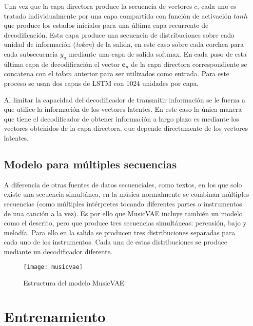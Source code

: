Una vez que la capa directora produce la secuencia de vectores $c$, cada uno es tratado individualmente por una capa compartida con función de activación $tanh$ que produce los estados iniciales para una última capa recurrente de decodificación. Esta capa produce una secuencia de distribuciones sobre cada unidad de información (\textit{token}) de la salida, en este caso sobre cada corchea para cada subsecuencia $y_u$ mediante una capa de salida softmax. En cada paso de esta última capa de decodificación el vector $\textbf{c}_u$ de la capa directora correspondiente se concatena con el $\textit{token}$ anterior para ser utilizados como entrada. Para este proceso se usan dos capas de LSTM con 1024 unidades por capa.

Al limitar la capacidad del decodificador de transmitir información se le fuerza a que utilice la información de los vectores latentes. En este caso la única manera que tiene el decodificador de obtener información a largo plazo es mediante los vectores obtenidos de la capa directora, que depende directamente de los vectores latentes.

\subsection{Modelo para múltiples secuencias}

A diferencia de otras fuentes de datos secuenciales, como textos, en los que solo existe una secuencia simultánea, en la música normalmente se combinan múltiples secuencias (como múltiples intérpretes tocando diferentes partes o instrumentos de una canción a la vez). Es por ello que MusicVAE incluye también un modelo como el descrito, pero que produce tres secuencias simultáneas: percusión, bajo y melodía. Para ello en la salida se producen tres distribuciones separadas para cada uno de los instrumentos. Cada una de estas distribuciones se produce mediante un decodificador diferente.

\begin{figure}[htpb]
  \centering
  \texttt{[image: musicvae]}
  \caption{Estructura del modelo MusicVAE}
  \label{fig:musicvae}
\end{figure}


\section{Entrenamiento}

